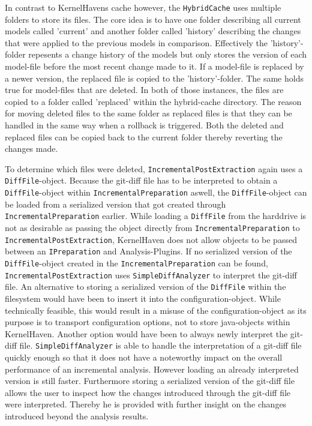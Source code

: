 \documentclass[a4paper]{article}
\begin{document}
 In contrast to KernelHavens cache however, the \texttt{HybridCache} uses multiple folders to store its files. The core idea is to have one folder describing all current models called 'current' and another folder called 'history' describing the changes that were applied to the previous models in comparison. Effectively the 'history'-folder repesents a change history of the models but only stores the version of each model-file before the most recent change made to it. 
 If a model-file is replaced by a newer version, the replaced file is copied to the 'history'-folder. The same holds true for model-files that are deleted. In both of those instances, the files are copied to a folder called 'replaced' within the hybrid-cache directory. The reason for moving deleted files to the same folder as replaced files is that they can be handled in the same way when a rollback is triggered. Both the deleted and replaced files can be copied back to the current folder thereby reverting the changes made.
 
To determine which files were deleted, \texttt{IncrementalPostExtraction} again uses a \texttt{DiffFile}-object. Because the git-diff file has to be interpreted to obtain a \texttt{DiffFile}-object within \texttt{IncrementalPreparation} aswell, the \texttt{DiffFile}-object can be loaded from a serialized version that got created through \texttt{IncrementalPreparation} earlier. While loading a \texttt{DiffFile} from the harddrive is not as desirable as passing the object directly from \texttt{IncrementalPreparation} to \texttt{IncrementalPostExtraction}, KernelHaven does not allow objects to be passed between an \texttt{IPreparation} and Analysis-Plugins. If no serialized version of the \texttt{DiffFile}-object created in the \texttt{IncrementalPreparation} can be found, \texttt{IncrementalPostExtraction} uses \texttt{SimpleDiffAnalyzer} to interpret the git-diff file. An alternative to storing a serialized version of the \texttt{DiffFile} within the filesystem would have been to insert it into the configuration-object. While technically feasible, this would result in a misuse of the configuration-object as its purpose is to transport configuration options, not to store java-objects within KernelHaven. Another option would have been to always newly interpret the git-diff file. \texttt{SimpleDiffAnalyzer} is able to handle the interpretation of a git-diff file quickly enough so that it does not have a noteworthy impact on the overall performance of an incremental analysis. However loading an already interpreted version is still faster. Furthermore storing a serialized version of the git-diff file allows the user to inspect how the changes introduced through the git-diff file were interpreted. Thereby he is provided with further insight on the changes introduced beyond the analysis results.
 
\end{document}
